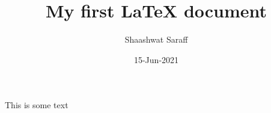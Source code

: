 \documentclass{article}
\author{Shaashwat Saraff}
\title{My first {\LaTeX} document}
\date{15-Jun-2021}
\begin{document}
  \maketitle

  This is some text
\end{document}
